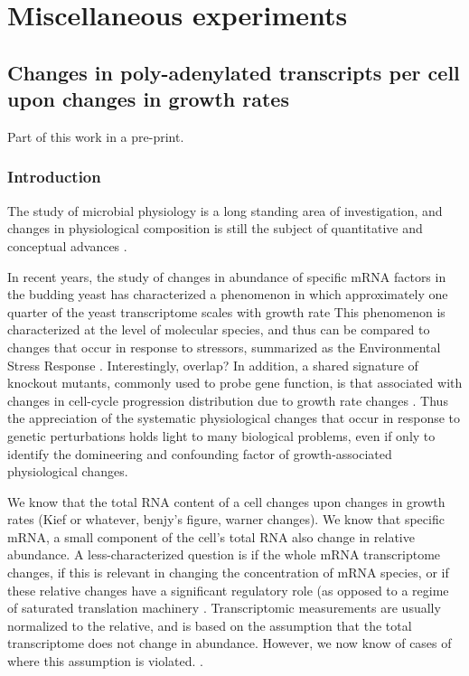 \chapter{Miscellaneous experiments}

%
%
%
\section{Changes in poly-adenylated transcripts per cell upon changes
in growth rates}
%
%
%

Part of this work in a pre-print.

%
%
%
\subsection{Introduction}
%
%
%

The study of microbial physiology is a long standing area of
investigation, and changes in physiological composition is still the
subject of quantitative and conceptual advances 
\parencite{henrici1928
malooe
waldron?
carter?
nitrogen upshift stuff?
more warner?
scott2010
hwarecent stuff
}.

In recent years, the study of changes in abundance of specific mRNA
factors in the budding yeast has characterized a phenomenon in which
approximately one quarter of the yeast transcriptome scales with
growth rate
\parencite{ Brauer 2008, Regenberg, Castrillo,  Airoldi2009
airoldi2016}
This phenomenon is characterized at the level of molecular species,
and thus can be compared to changes that occur in response to
stressors, summarized as the Environmental Stress Response 
\parencite{gasch2000genomic}.
Interestingly, overlap?
In addition, a shared signature of knockout mutants, commonly used to
probe gene function, is that associated with changes in cell-cycle
progression distribution due to growth rate changes
\parencite{
cell cycle kemmern thing}.
Thus the appreciation of the systematic physiological changes that
occur in response to genetic perturbations holds light to many
biological problems, even if only to identify the domineering and 
confounding factor of growth-associated physiological changes.

We know that the total RNA content of a cell changes upon changes in
growth rates (Kief or whatever, benjy's figure, warner changes).
We know that specific mRNA, a small component of the cell's total RNA
also change in relative abundance. A less-characterized question is if
the whole mRNA transcriptome changes, if this is relevant in changing
the concentration of mRNA species, or if these relative changes have a
significant regulatory role (as opposed to a regime of saturated
translation machinery \parencite{shah2013??}.
Transcriptomic measurements are usually normalized to the relative,
and is based on the assumption that the total transcriptome does not
change in abundance.
However, we now know of cases of where this assumption is violated.
\parencite{myc example}.

